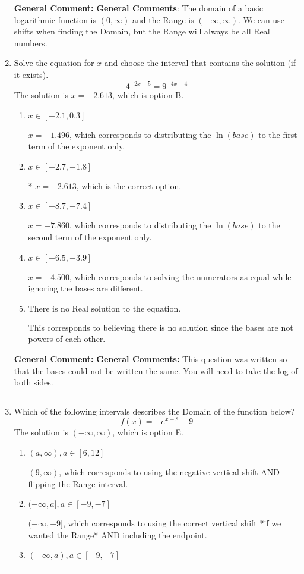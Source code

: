\documentclass{extbook}[14pt]
\newcommand{\litem}[1]{\item #1

\rule{\textwidth}{0.4pt}}
\begin{document}
\begin{enumerate}
{\textbf{General Comment:} \textbf{General Comments}: The domain of a basic logarithmic function is $(0, \infty)$ and the Range is $(-\infty, \infty)$. We can use shifts when finding the Domain, but the Range will always be all Real numbers.
}
\litem{
Solve the equation for $x$ and choose the interval that contains the solution (if it exists).
\[ 4^{-2x+5} = 9^{-4x-4} \]The solution is \( x = -2.613 \), which is option B.\begin{enumerate}[label=\Alph*.]
\item \( x \in [-2.1, 0.3] \)

$x = -1.496$, which corresponds to distributing the $\ln(base)$ to the first term of the exponent only.
\item \( x \in [-2.7, -1.8] \)

* $x = -2.613$, which is the correct option.
\item \( x \in [-8.7, -7.4] \)

$x = -7.860$, which corresponds to distributing the $\ln(base)$ to the second term of the exponent only.
\item \( x \in [-6.5, -3.9] \)

$x = -4.500$, which corresponds to solving the numerators as equal while ignoring the bases are different.
\item \( \text{There is no Real solution to the equation.} \)

This corresponds to believing there is no solution since the bases are not powers of each other.
\end{enumerate}

\textbf{General Comment:} \textbf{General Comments:} This question was written so that the bases could not be written the same. You will need to take the log of both sides.
}
\litem{
Which of the following intervals describes the Domain of the function below?
\[ f(x) = -e^{x+8}-9 \]The solution is \( (-\infty, \infty) \), which is option E.\begin{enumerate}[label=\Alph*.]
\item \( (a, \infty), a \in [6, 12] \)

$(9, \infty)$, which corresponds to using the negative vertical shift AND flipping the Range interval.
\item \( (-\infty, a], a \in [-9, -7] \)

$(-\infty, -9]$, which corresponds to using the correct vertical shift *if we wanted the Range* AND including the endpoint.
\item \( (-\infty, a), a \in [-9, -7] \)


\end{enumerate}}
\end{enumerate}
\end{document}
